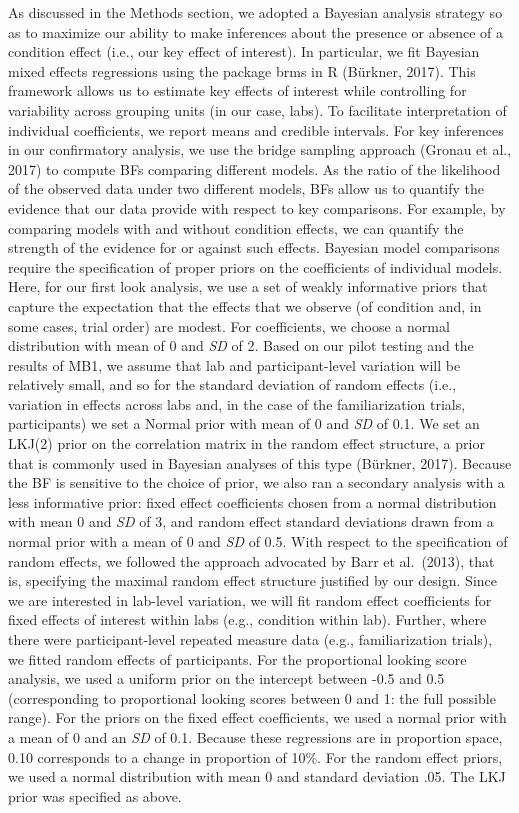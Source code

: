 \documentclass[
  english,
  man,floatsintext]{apa6}
\begin{document}
As discussed in the Methods section, we adopted a Bayesian analysis strategy so as to maximize our ability to make inferences about the presence or absence of a condition effect (i.e., our key effect of interest). In particular, we fit Bayesian mixed effects regressions using the package brms in R (Bürkner, 2017). This framework allows us to estimate key effects of interest while controlling for variability across grouping units (in our case, labs).
To facilitate interpretation of individual coefficients, we report means and credible intervals. For key inferences in our confirmatory analysis, we use the bridge sampling approach (Gronau et al., 2017) to compute BFs comparing different models. As the ratio of the likelihood of the observed data under two different models, BFs allow us to quantify the evidence that our data provide with respect to key comparisons. For example, by comparing models with and without condition effects, we can quantify the strength of the evidence for or against such effects.
Bayesian model comparisons require the specification of proper priors on the coefficients of individual models. Here, for our first look analysis, we use a set of weakly informative priors that capture the expectation that the effects that we observe (of condition and, in some cases, trial order) are modest. For coefficients, we choose a normal distribution with mean of 0 and \emph{SD} of 2. Based on our pilot testing and the results of MB1, we assume that lab and participant-level variation will be relatively small, and so for the standard deviation of random effects (i.e., variation in effects across labs and, in the case of the familiarization trials, participants) we set a Normal prior with mean of 0 and \emph{SD} of 0.1. We set an LKJ(2) prior on the correlation matrix in the random effect structure, a prior that is commonly used in Bayesian analyses of this type (Bürkner, 2017). Because the BF is sensitive to the choice of prior, we also ran a secondary analysis with a less informative prior: fixed effect coefficients chosen from a normal distribution with mean 0 and \emph{SD} of 3, and random effect standard deviations drawn from a normal prior with a mean of 0 and \emph{SD} of 0.5. With respect to the specification of random effects, we followed the approach advocated by Barr et al.~(2013), that is, specifying the maximal random effect structure justified by our design. Since we are interested in lab-level variation, we will fit random effect coefficients for fixed effects of interest within labs (e.g., condition within lab). Further, where there were participant-level repeated measure data (e.g., familiarization trials), we fitted random effects of participants.
For the proportional looking score analysis, we used a uniform prior on the intercept between -0.5 and 0.5 (corresponding to proportional looking scores between 0 and 1: the full possible range). For the priors on the fixed effect coefficients, we used a normal prior with a mean of 0 and an \emph{SD} of 0.1. Because these regressions are in proportion space, 0.10 corresponds to a change in proportion of 10\%. For the random effect priors, we used a normal distribution with mean 0 and standard deviation .05. The LKJ prior was specified as above.
\end{document}
